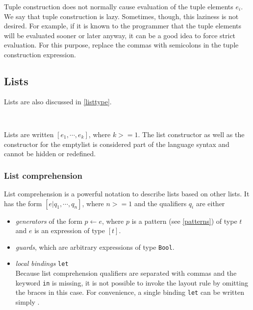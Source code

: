 Tuple construction does not normally cause evaluation of the tuple elements $e_i$. We say that tuple construction is lazy. Sometimes, though, this laziness is not desired. For example, if it is known to the programmer that the tuple elements will be evaluated sooner or later anyway, it can be a good idea to force strict evaluation. For this purpose, replace the commas with semicolons in the tuple construction expression.

\subsection{Lists} \label{listterm} 

Lists are also discussed in \autoref{listtype}.

\begin{flushleft}
 \sym{[]}  
  \alt{} \bracka{}\brackz{}
  \alt{} \sym{[}  \sym{$|$}  \sym{]} \\
  \sym{<-}  
  \alt{}     
\end{flushleft}

Lists are written $[e_1, \cdots, e_k]$, where $k>=1$. The list constructor \sym{:} as well as the constructor for the emptylist \sym{[]} is considered part of the language syntax and cannot be hidden or redefined.


\subsubsection{List comprehension}  

List comprehension is a powerful notation to describe lists based on other lists. It has the form $[ e | q_1, \cdots, q_n]$, where $n>=1$ and the qualifiers $q_i$ are either
\begin{itemize}
\item \emph{generators} of the form $p \leftarrow{} e$, where $p$ is a pattern (see \autoref{patterns}) of type $t$ and $e$ is an expression of type $[t]$.
\item \emph{guards}, which are arbitrary expressions of type \texttt{Bool}.
\item \emph{local bindings} \texttt{let} \bracea{}  \bracez{}\\
Because list comprehension qualifiers are separated with commas and the keyword \texttt{in} is missing, 
it is not possible to invoke the layout rule by omitting the braces in this case. 
For convenience, a single binding \texttt{let} \bracea{}  \bracez{}
can be written simply .
\end{itemize}

